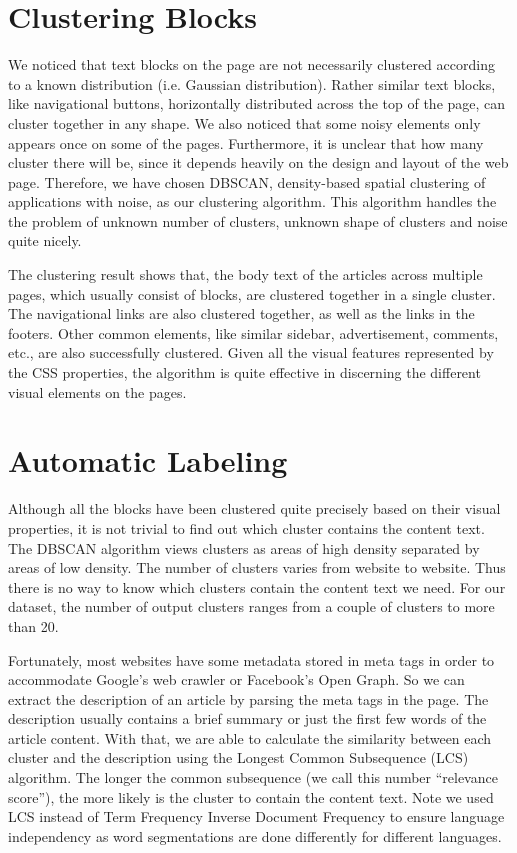 \documentclass{acm_proc_article-sp}
\begin{document}
\section{Clustering Blocks}

We noticed that text blocks on the page are not necessarily clustered according to a known distribution (i.e. Gaussian distribution). Rather similar text blocks, like navigational buttons, horizontally distributed across the top of the page, can cluster together in any shape. We also noticed that some noisy elements only appears once on some of the pages. Furthermore, it is unclear that how many cluster there will be, since it depends heavily on the design and layout of the web page. Therefore, we have chosen DBSCAN\cite{ester:dbscan}, density-based spatial clustering of applications with noise, as our clustering algorithm. This algorithm handles the the problem of unknown number of clusters, unknown shape of clusters and noise quite nicely.

The clustering result shows that, the body text of the articles across multiple pages, which usually consist of blocks, are clustered together in a single cluster. The navigational links are also clustered together, as well as the links in the footers. Other common elements, like similar sidebar, advertisement, comments, etc., are also successfully clustered. Given all the visual features represented by the CSS properties, the algorithm is quite effective in discerning the different visual elements on the pages.

\section{Automatic Labeling}

Although all the blocks have been clustered quite precisely based on their visual properties, it is not trivial to find out which cluster contains the content text. The DBSCAN algorithm views clusters as areas of high density separated by areas of low density. The number of clusters varies from website to website. Thus there is no way to know which clusters contain the content text we need. For our dataset, the number of output clusters ranges from a couple of clusters to more than 20.

Fortunately, most websites have some metadata stored in meta tags in order to accommodate Google's web crawler or Facebook's Open Graph. So we can extract the description of an article by parsing the meta tags in the page. The description usually contains a brief summary or just the first few words of the article content. With that, we are able to calculate the similarity between each cluster and the description using the Longest Common Subsequence (LCS) algorithm. The longer the common subsequence (we call this number ``relevance score''), the more likely is the cluster to contain the content text. Note we used LCS instead of Term Frequency Inverse Document Frequency to ensure language independency as word segmentations are done differently for different languages.
\end{document}
